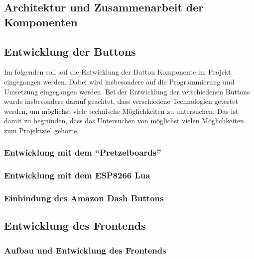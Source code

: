 

\subsection{Architektur und Zusammenarbeit der Komponenten}        
\label{sec:Architektur und Zusammenarbeit der Komponenten-1} 



\newpage

\subsection{Entwicklung der Buttons}  
\label{sec:Entwicklung der Buttons-1} 

Im folgenden soll auf die Entwicklung der Button Komponente im Projekt eingegangen werden. Dabei wird insbesondere auf die Programmierung und Umsetzung eingegangen werden. 
Bei der Entwicklung der verschiedenen Buttons wurde insbesondere darauf geachtet, dass verschiedene Technologien getestet werden, um möglichst viele technische Möglichkeiten zu untersuchen. Das ist damit zu begründen, dass das Untersuchen von möglichst vielen Möglichkeiten zum Projektziel gehörte. 

\subsubsection{Entwicklung mit dem ``Pretzelboards''}  
\label{sec:Entwicklung mit dem ``Pretzelboards''-1}

\subsubsection{Entwicklung mit dem ESP8266 Lua}  
\label{sec:Entwicklung mit dem ESP8266-1}

\subsubsection{Einbindung des Amazon Dash Buttons}  
\label{sec:Einbindung des Amazon Dash Buttons-1}

\newpage

\subsection{Entwicklung des Frontends}  
\label{sec:Entwicklung der Frontends-1} 

\subsubsection{Aufbau und Entwicklung des Frontends}  
\label{sec:Aufbau und Entwicklung des Frontends-1}

